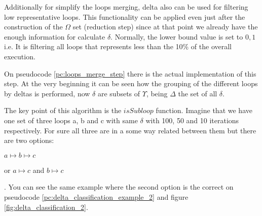 Additionally for simplify the loops merging, delta also can be used for
filtering low representative loops. This functionality can be applied even
just after the construction of the $\Omega$ set (reduction step) since at that
point we already have the enough information for calculate $\delta$. Normally,
the lower bound value is set to $0,1$ i.e. It is filtering all loops that
represents less than the 10\% of the overall execution.

On pseudocode \ref{pc:loops_merge_step} there is the actual implementation of
this step. At the very beginning it can be seen how the grouping of the
different loops by deltas is performed, now $\delta$ are subsets of
$\Upsilon$, being $\Delta$ the set of all $\delta$.

\begin{pseudocode}{Loops merge step}{\Upsilon}
\label{pc:loops_merge_step}
    \Delta \GETS deltaClassification(\Upsilon) \\
    \FORALL \delta \in \Delta \DO 
    \BEGIN
         \\
        sort(\upsilon \in \delta) \\
        \FOR i \in [0, |\delta|-1) \DO
        \BEGIN
            \FOR j \in [i+1, |\delta|) \DO
            \BEGIN
              \IF isSubloop(\delta_{i}, \delta{j}) \THEN
                  \delta_{i} \mapsto \delta{j} \\
            \END
        \END
    \END
\end{pseudocode}

The key point of this
algorithm is the $isSubloop$ function. Imagine that we have one set of three loops
a, b and c with same $\delta$ with 100, 50 and 10 iterations respectively. 
For sure all three are in a some way related between them but there are two options:
\begin{enumerate*}[label=\roman*)]
    \item $a \mapsto b \mapsto c$
    \item or $a \mapsto c$ and $b \mapsto c$
\end{enumerate*}. You can see the same example where the second option is the
correct on pseudocode
\ref{pc:delta_classification_example_2} and figure
\ref{fig:delta_classification_2}.

